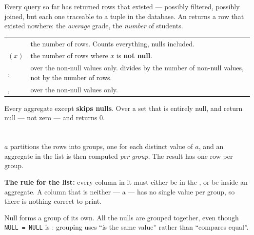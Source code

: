 Every query so far has returned rows that existed --- possibly filtered,
possibly joined, but each one traceable to a tuple in the database. An
 returns a row that existed nowhere: the \emph{average} grade, the
\emph{number} of students.

\begin{definitionbox}
\begin{tabular}{@{}L{3.6cm}L{10.4cm}@{}}
 & the number of rows. Counts everything, nulls included. \\
$(x)$ & the number of rows where $x$ is \textbf{not null}. \\
,  & over the non-null values only. 
  divides by the number of non-null values, not by the number of rows. \\
,  & over the non-null values only. \\
\end{tabular}

\smallskip
Every aggregate except  \textbf{skips nulls}. Over a set that
is entirely null,  and  return null --- not zero ---
and  returns 0.
\end{definitionbox}

\section{}

\begin{definitionbox}[Grouping]
 $a$ partitions the rows into groups, one for each distinct
value of $a$, and an aggregate in the  list is then computed
\emph{per group}. The result has one row per group.

\smallskip
\textbf{The rule for the  list:} every column in it must either
be in the , or be inside an aggregate. A column that is neither
--- a  --- has no single value per group, so there is
nothing correct to print.

\smallskip
Null forms a group of its own. All the nulls are grouped together, even though
\texttt{NULL = NULL} is \unk{}: grouping uses ``is the same value''
rather than ``compares equal''.
\end{definitionbox}

